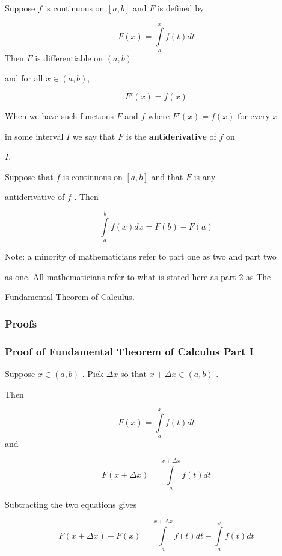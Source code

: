 Suppose $f$ is continuous on $[a,b]$ and $F$ is defined by


\[
F(x)=\int\limits_a^x f(t)dt
\] Then $F$ is differentiable on $(a,b)$

and for all $x\in(a,b)$,


\[
F'(x)=f(x)
\]


When we have such functions $F$ and $f$ where $F'(x)=f(x)$ for every $x$

in some interval $I$ we say that $F$ is the \textbf{antiderivative} of $f$ on

$I$.


Suppose that $f$ is continuous on $[a,b]$ and that $F$ is any

antiderivative of $f$ . Then


\[
\int\limits_a^b f(x)dx=F(b)-F(a)
\]




Note: a minority of mathematicians refer to part one as two and part two

as one. All mathematicians refer to what is stated here as part 2 as The

Fundamental Theorem of Calculus.


\subsubsection{Proofs}
\label{sss:proo-dbb5}


\subsubsection{Proof of Fundamental Theorem of Calculus Part I}
\label{sss:proo-b3b2}


Suppose $x\in(a,b)$ . Pick $\Delta x$ so that $x+\Delta x\in(a,b)$ .

Then


\[
F(x)=\int\limits_a^x f(t)dt
\] and


\[
F(x+\Delta x)=\int\limits_a^{x+\Delta x}f(t)dt
\]


Subtracting the two equations gives


\[
F(x+\Delta x)-F(x)=\int\limits_a^{x+\Delta x}f(t)dt-\int\limits_a^x f(t)dt
\]


